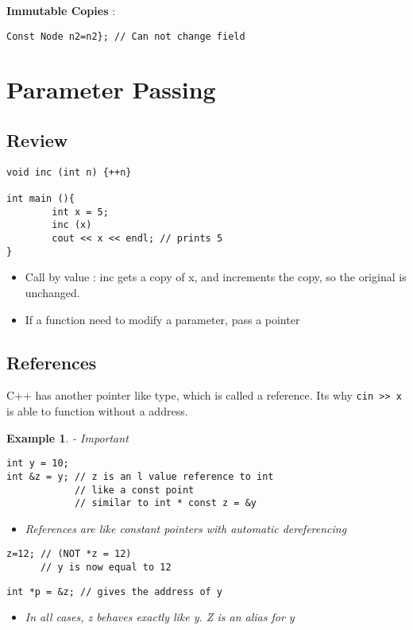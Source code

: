 \documentclass{article}
\newtheorem{ex}[theorem]{Example}
\begin{document}
\textbf{Immutable Copies} :
\begin{lstlisting}
Const Node n2=n2}; // Can not change field
\end{lstlisting}


\section{Parameter Passing}

\subsection{Review}
\begin{lstlisting}
void inc (int n) {++n}

int main (){
		int x = 5;
		inc (x)
		cout << x << endl; // prints 5 
}
\end{lstlisting}

\begin{itemize}
\item Call by value : inc gets a copy of x, and increments the copy, so the original is unchanged.
\item If a function need to modify a parameter, pass a pointer
\end{itemize}

\subsection{References}
C++ has another pointer like type, which is called a reference. Its why \verb|cin >> x | is able to function without a address.


\begin{ex} - Important
\begin{lstlisting}
int y = 10;
int &z = y; // z is an l value reference to int 
            // like a const point 
            // similar to int * const z = &y
\end{lstlisting}

\begin{itemize}
\item References are like constant pointers with automatic dereferencing 
\end{itemize}

\begin{lstlisting}
z=12; // (NOT *z = 12)
	  // y is now equal to 12
\end{lstlisting}

\begin{lstlisting}
int *p = &z; // gives the address of y
\end{lstlisting}
\begin{itemize}
\item In all cases, z behaves exactly like y. Z is an alias for y 
\end{itemize}
\end{ex}
\end{document}
